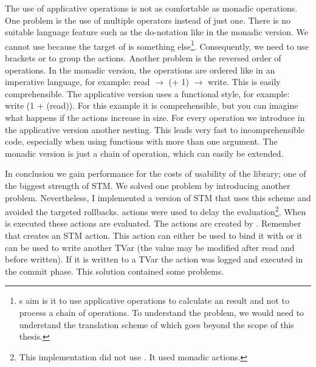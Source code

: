 The use of applicative operations is not as comfortable as monadic operations. One problem is the use of 
multiple operators instead of just one. There is no suitable language feature such as the do-notation like 
in the monadic version. We cannot use  because the target
of  is something else\footnote{s aim is it to use applicative 
operations to calculate an result and not to process a chain of operations. To understand the problem,
we would need to understand the translation scheme of  which goes beyond the scope of
this thesis.}. Consequently, we need to use brackets or \code{\$} to group the actions. Another problem is  
the reversed order of operations. In the monadic version, the operations are ordered like in an imperative
language, for example: read $\rightarrow$ (+ 1) $\rightarrow$ write. This is easily comprehensible. The 
applicative version uses a functional style, for example: write (1 + (read)). For this example it is 
comprehensible, but you can imagine what happens if the actions increase in size. For every operation
we introduce in the applicative version another nesting. This leads very fast to incomprehensible code,
especially when using functions with more than one argument. The monadic version is just a chain of operation, 
which can easily be extended. 

In conclusion we gain performance for the costs of usability of the library; one of the biggest strength of
STM. We solved one problem by introducing another problem. Nevertheless, I implemented a version of STM
that uses this scheme and avoided the targeted rollbacks.  actions were used
to delay the evaluation\footnote{This implementation did not use . It used monadic  actions.}. 
When \code{>>=} is executed these  actions are evaluated. The  actions are created by .
Remember that  creates an STM action. This action can either be used to bind it with \code{>>=} or it 
can be used to write another TVar (the value may be modified after read and before written). If it is written to a 
TVar the  action was logged and executed in the commit phase. This solution contained some problems.

